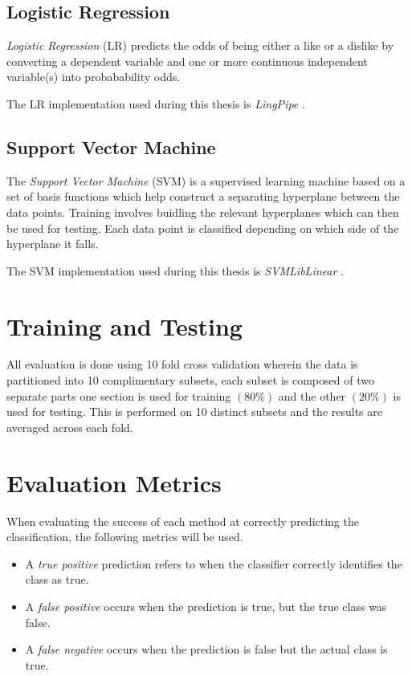 \subsection{Logistic Regression}
\label{sec:lr}

\emph{Logistic Regression} (LR) predicts the odds of being either a like or a dislike by converting a dependent variable and one or more continuous 
independent variable(s) into probabability odds.

The LR implementation used during this thesis is \emph{LingPipe} \cite{lin}.

\subsection{Support Vector Machine}
\label{sec:svm}

The \emph{Support Vector Machine} (SVM) is a supervised learning machine based on a set of basis functions which help construct a separating 
hyperplane between the data points. Training involves buidling the relevant hyperplanes which can then be used for testing. Each data point is
classified depending on which side of the hyperplane it falls.

The SVM implementation used during this thesis is \emph{SVMLibLinear} \cite{cjlin}.

\section{Training and Testing}
\label{sec:tt}

All evaluation is done using 10 fold cross validation wherein the data is partitioned into 10 complimentary subsets, each subset is composed 
of two separate parts one section is used for training $(80\%)$ and the other $(20\%)$ is used for testing. This is performed on 10 distinct 
subsets and the results are averaged across each fold.

\section{Evaluation Metrics}
\label{sec:notation}

When evaluating the success of each method at correctly predicting the classification, the following metrics will be used.

\begin{itemize}
\item A \emph{true positive} prediction refers to when the classifier correctly identifies the class as true. 
\item A \emph{false positive} occurs when the prediction is true, but the true class was false. 
\item A \emph{false negative} occurs when the prediction is false but the actual class is true.
\end{itemize}


